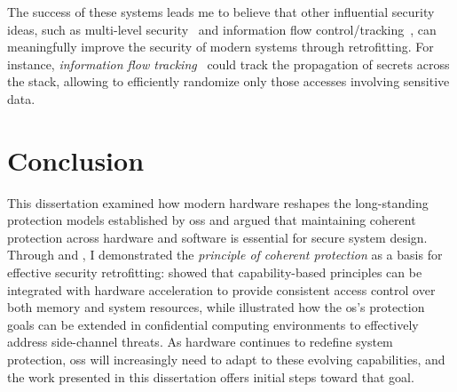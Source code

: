 The success of these systems leads me to believe that other influential security ideas, such as multi-level security~\cite{mccullough1987specifications} and information flow control/tracking~\cite{histar,denning1977certification,mohit2009complete}, can meaningfully improve the security of modern systems through retrofitting.
For instance, \emph{information flow tracking}~\cite{denning1977certification,mohit2009complete,enck2014taintdroid} could track the propagation of secrets across the stack, allowing \incognitos to efficiently randomize only those accesses involving sensitive data.

\clearpage

\section{Conclusion}
This dissertation examined how modern hardware reshapes the long-standing protection models established by \glspl{os} and argued that maintaining coherent protection across hardware and software is essential for secure system design.
Through \capacity and \incognitos, I demonstrated the \emph{principle of coherent protection} as a basis for effective security retrofitting:
\capacity showed that capability-based principles can be integrated with hardware acceleration to provide consistent access control over both memory and system resources, while \incognitos illustrated how the \gls{os}'s protection goals can be extended in confidential computing environments to effectively address side-channel threats.
As hardware continues to redefine system protection, \glspl{os} will increasingly need to adapt to these evolving capabilities, and the work presented in this dissertation offers initial steps toward that goal.

